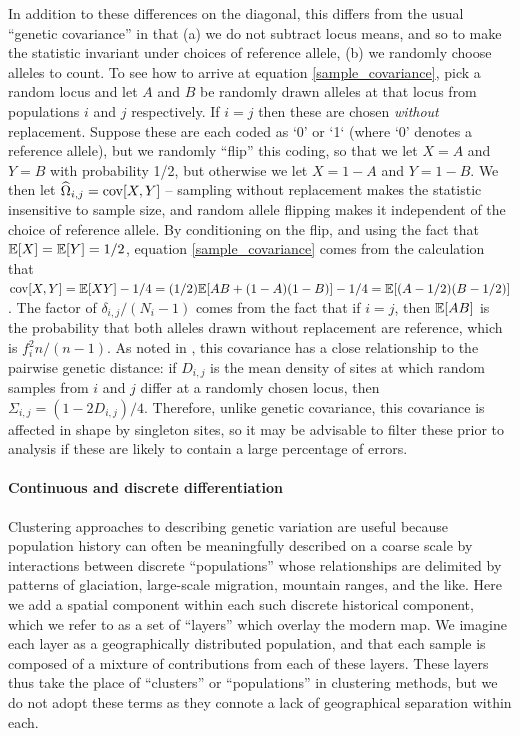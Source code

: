 \documentclass[12pt]{article}
\begin{document}
In addition to these differences on the diagonal,
this differs from the usual ``genetic covariance'' \cite{mcvean_genealogical_2009}
in that (a) we do not subtract locus means,
and so to make the statistic invariant under choices of reference allele, 
(b) we randomly choose alleles to count.
To see how to arrive at equation \eqref{sample_covariance},
pick a random locus and
let $A$ and $B$ be randomly drawn alleles at that locus from populations $i$ and $j$ respectively.
If $i=j$ then these are chosen \emph{without} replacement.
Suppose these are each coded as `0' or `1` (where `0' denotes a reference allele),
but we randomly ``flip'' this coding, so that we let $X=A$ and $Y=B$ with probability 1/2,
but otherwise we let $X=1-A$ and $Y=1-B$.
We then let $\widehat{\Omega}_{i,j} = \mathop{\mbox{cov}}[X,Y]$ --
sampling without replacement makes the statistic insensitive to sample size,
and random allele flipping makes it independent of the choice of reference allele.
By conditioning on the flip,
and using the fact that $\mathbb{E}[X] = \mathbb{E}[Y] = 1/2$,
equation \eqref{sample_covariance} comes from the calculation that
$\mathop{\mbox{cov}}[X,Y] = \mathbb{E}[XY] - 1/4 = (1/2)\mathbb{E}[AB + (1-A)(1-B)] - 1/4 = \mathbb{E}[(A-1/2)(B-1/2)]$.
The factor of $\delta_{i,j}/(N_i-1)$ comes from the fact that if $i=j$,
then $\mathbb{E}[AB]$ is the probability that both alleles drawn without replacement are reference,
which is $f_i^2 n/(n-1)$.
As noted in \cite{EEMS},
this covariance has a close relationship to the pairwise genetic distance:
if $D_{i,j}$ is the mean density of sites at which random samples from $i$ and $j$ differ at a randomly chosen locus,
then $\Sigma_{i,j} = (1 - 2 D_{i,j})/4$.
Therefore, unlike genetic covariance,
this covariance is affected in shape by singleton sites,
so it may be advisable to filter these prior to analysis
if these are likely to contain a large percentage of errors.




\paragraph{Continuous and discrete differentiation}
Clustering approaches to describing genetic variation
are useful because population history can often be meaningfully described on a coarse scale
by interactions between discrete ``populations''
whose relationships are delimited by patterns of glaciation,
large-scale migration,
mountain ranges, and the like.
Here we add a spatial component within each such discrete historical component,
which we refer to as a set of ``layers'' which overlay the modern map.
We imagine each layer as a geographically distributed population,
and that each sample is composed of a mixture of contributions from each of these layers.
These layers thus take the place of ``clusters'' or ``populations'' in clustering methods,
but we do not adopt these terms as they connote a lack of geographical separation within each.
\end{document}
